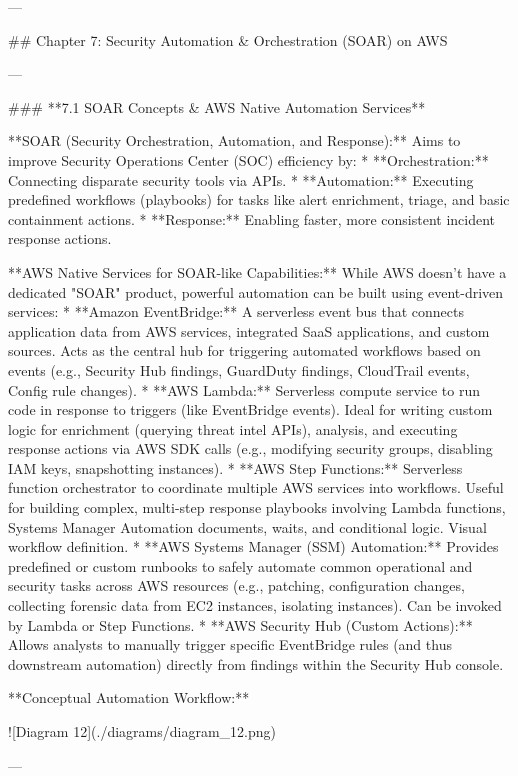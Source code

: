 \documentclass{article}
\begin{document}
---

## Chapter 7: Security Automation & Orchestration (SOAR) on AWS

---

### **7.1 SOAR Concepts & AWS Native Automation Services**

**SOAR (Security Orchestration, Automation, and Response):** Aims to improve Security Operations Center (SOC) efficiency by:
* **Orchestration:** Connecting disparate security tools via APIs.
* **Automation:** Executing predefined workflows (playbooks) for tasks like alert enrichment, triage, and basic containment actions.
* **Response:** Enabling faster, more consistent incident response actions.

**AWS Native Services for SOAR-like Capabilities:**
While AWS doesn't have a dedicated "SOAR" product, powerful automation can be built using event-driven services:
* **Amazon EventBridge:** A serverless event bus that connects application data from AWS services, integrated SaaS applications, and custom sources. Acts as the central hub for triggering automated workflows based on events (e.g., Security Hub findings, GuardDuty findings, CloudTrail events, Config rule changes).
* **AWS Lambda:** Serverless compute service to run code in response to triggers (like EventBridge events). Ideal for writing custom logic for enrichment (querying threat intel APIs), analysis, and executing response actions via AWS SDK calls (e.g., modifying security groups, disabling IAM keys, snapshotting instances).
* **AWS Step Functions:** Serverless function orchestrator to coordinate multiple AWS services into workflows. Useful for building complex, multi-step response playbooks involving Lambda functions, Systems Manager Automation documents, waits, and conditional logic. Visual workflow definition.
* **AWS Systems Manager (SSM) Automation:** Provides predefined or custom runbooks to safely automate common operational and security tasks across AWS resources (e.g., patching, configuration changes, collecting forensic data from EC2 instances, isolating instances). Can be invoked by Lambda or Step Functions.
* **AWS Security Hub (Custom Actions):** Allows analysts to manually trigger specific EventBridge rules (and thus downstream automation) directly from findings within the Security Hub console.

**Conceptual Automation Workflow:**


![Diagram 12](./diagrams/diagram_12.png)



---
\end{document}
